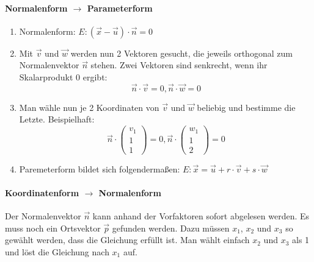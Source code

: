 \documentclass[a4paper,10pt,DIV9, BCOR12mm, oneside,openright,openbib]{scrreprt}
\theoremstyle{definition}
\theoremstyle{plain}
\begin{document}
\paragraph{Normalenform $\longrightarrow$ Parameterform}
\begin{enumerate}
 \item Normalenform: $E: ({\vec x}-{\vec u})\cdot {\vec n}=0$
 \item Mit $\vec{v}$ und $\vec{w}$ werden nun 2 Vektoren gesucht, die jeweils orthogonal zum Normalenvektor $\vec{n}$ stehen. Zwei Vektoren sind senkrecht, wenn ihr Skalarprodukt 0 ergibt:
 \[ \vec{n} \cdot \vec{v} = 0, \vec{n} \cdot \vec{w} = 0\]
 \item Man wähle nun je 2 Koordinaten von $\vec v$ und $\vec w$ beliebig und bestimme die Letzte. Beispielhaft:
 \[ \vec{n} \cdot  \begin{pmatrix}v_1 \\ 1 \\ 1\end{pmatrix} = 0, \vec{n} \cdot  \begin{pmatrix}w_1 \\ 1 \\ 2\end{pmatrix} = 0\]
 \item Paremeterform bildet sich folgendermaßen:  $E: \overrightarrow{x} = \overrightarrow{u} + r \cdot \overrightarrow{v} + s \cdot \overrightarrow{w}$
\end{enumerate}

\paragraph{Koordinatenform $\longrightarrow$ Normalenform} 
Der Normalenvektor $\vec n$ kann anhand der Vorfaktoren sofort abgelesen werden. Es muss noch ein Ortsvektor $\vec p$ gefunden werden. Dazu müssen $x_1$, $x_2$ und $x_3$ so gewählt werden, dass die Gleichung erfüllt ist. Man wählt einfach $x_2$ und $x_3$ als 1 und löst die Gleichung nach $x_1$ auf.
\end{document}
